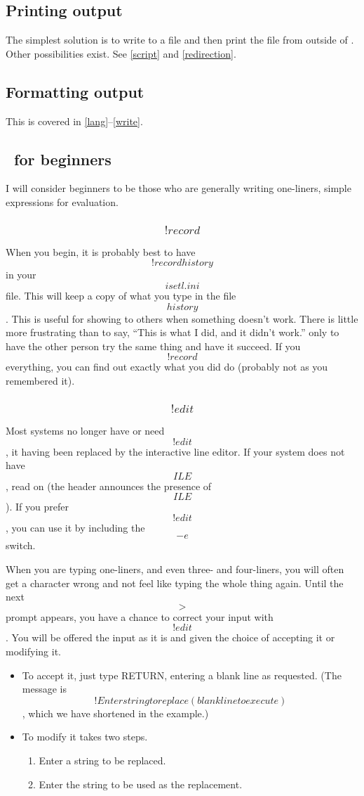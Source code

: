 \subsection{Printing output}
The simplest solution is to write to a file and then print the file
from outside of \ISETL\@.  Other possibilities exist.  See
\ref{script} and \ref{redirection}.

\subsection{Formatting output}
This is covered in \ref{lang}--\ref{write}.

\subsection{\ISETL\ for beginners}
I will consider beginners to be those who are generally
writing one-liners, simple expressions for evaluation.

\subsubsection{\[!record\]}
When you begin, it is probably best to have \[!record history\] in your
\[isetl.ini\] file.  This will keep a copy of what you type in the file
\[history\].  This is useful for showing to others when something doesn't
work.  There is little more frustrating than to say, ``This is what I did,
and it didn't work.'' only to have the other person try the same thing and
have it succeed.  If you \[!record\] everything, you can find out exactly
what you did do (probably not as you remembered it).

\subsubsection{\[!edit\]}\label{edit}
Most systems no longer have or need \[!edit\], it having been replaced
by the interactive line editor.  If your system does not have \[ILE\],
read on (the header announces the presence of \[ILE\]).
If you prefer \[!edit\], you can use it by including the \[-e\] switch.

When you are typing one-liners, and even three- and four-liners,
you will often get a character wrong and not feel like typing the
whole thing again.
Until the next \[>\] prompt appears, you have a chance to correct
your input with \[!edit\].  You will be offered the input as
it is and given the choice of accepting it or modifying it.
\begin{itemize}
\item To accept it, just type RETURN, entering a blank line as requested.
    (The message is \[!Enter string to replace (blank line to execute)\],
    which we have shortened in the example.)
\item To modify it takes two steps.
    \begin{enumerate}
    \item Enter a string to be replaced.
    \item Enter the string to be used as the replacement.
    \end{enumerate}
\end{itemize}

